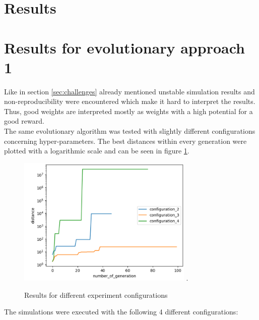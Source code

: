 \section{Results}
\label{sec:results}

\section{Results for evolutionary approach 1}
\label{sec:results_1}

Like in section \ref{sec:challenges} already mentioned unstable simulation results and non-reproducibility were encountered which make it hard to interpret the results. Thus, good weights are interpreted mostly as weights with a high potential for a good reward.\\
The same evolutionary algorithm was tested with slightly different configurations concerning hyper-parameters. 
The best distances within every generation were plotted with a logarithmic scale and can be seen in figure \ref{fig:results_1}. 

\begin{figure}[H]
	\centering
	\includegraphics[width=3.3in]{img/results_1.png}
	\DeclareGraphicsExtensions.
	\caption{Results for different experiment configurations}
	\label{fig:results_1}
\end{figure}

The simulations were executed with the following 4 different configurations:\\

